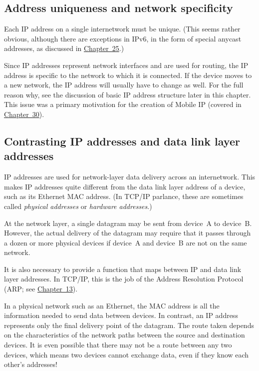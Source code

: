 \subsection{Address uniqueness and network specificity}

Each IP address on a single internetwork must be unique.
(This seems rather obvious, although there are exceptions in IPv6, in the form of special anycast addresses, as discussed in \protect\hyperlink{ch25.html}{Chapter~25}.)

Since IP addresses represent network interfaces and are used for routing, the IP address is
specific to the network to which it is connected. If the device moves to
a new network, the IP address will usually have to change as well. For
the full reason why, see the discussion of basic IP address structure
later in this chapter. This issue was a primary motivation for the
creation of Mobile IP (covered in
\protect\hyperlink{ch30.html}{Chapter~30}).



\subsection{Contrasting IP addresses and data link layer addresses}

\protect\hypertarget{ch16.htmlux5cux23idx-CHP-16-0648}{}{}IP addresses
are used for network-layer data delivery across an internetwork. This
makes IP addresses quite different from the data link layer address of a
device, such as its Ethernet MAC address. (In TCP/IP parlance, these are
sometimes called {\emph{physical addresses}} or
\protect\hypertarget{ch16.htmlux5cux23idx-CHP-16-0649}{}{}{\emph{hardware
addresses}}.)

At the network layer, a single datagram may be sent from device~A to device~B.
However, the actual delivery of the datagram may require that it passes through a dozen or more physical devices if device~A and device~B are not on the same network.

It is also necessary to provide a function that maps between IP and data link layer addresses.
In TCP/IP, this is the job of the Address Resolution Protocol (ARP; see \protect\hyperlink{ch13.html}{Chapter~13}).

In a physical network such as an Ethernet, the MAC address is all the
information needed to send data between devices. In contrast, an IP
address represents only the final delivery point of the datagram. The
route taken depends on the characteristics of the network paths between
the source and destination devices. It is even possible that there may
not be a route between any two devices, which means two devices cannot
exchange data, even if they know each other's addresses!



